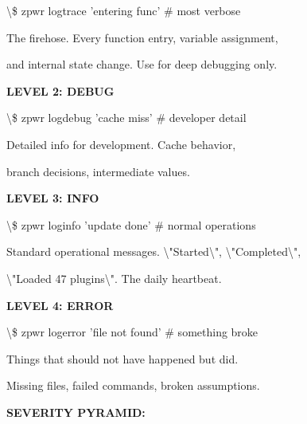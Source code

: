 \documentclass[11pt,a4paper,twoside]{book}
\begin{document}
\begin{codebox}
\textbackslash{}\$ zpwr logtrace 'entering func'  \# most verbose\\
\end{codebox}

The firehose. Every function entry, variable assignment,

and internal state change. Use for deep debugging only.


\vspace{12pt}
{\bfseries\color{neonyellow} LEVEL 2: DEBUG}\vspace{4pt}

\begin{codebox}
\textbackslash{}\$ zpwr logdebug 'cache miss'    \# developer detail\\
\end{codebox}

Detailed info for development. Cache behavior,

branch decisions, intermediate values.


\vspace{12pt}
{\bfseries\color{neonyellow} LEVEL 3: INFO}\vspace{4pt}

\begin{codebox}
\textbackslash{}\$ zpwr loginfo 'update done'    \# normal operations\\
\end{codebox}

Standard operational messages. \textbackslash{}"Started\textbackslash{}", \textbackslash{}"Completed\textbackslash{}",

\textbackslash{}"Loaded 47 plugins\textbackslash{}". The daily heartbeat.


\vspace{12pt}
{\bfseries\color{neonyellow} LEVEL 4: ERROR}\vspace{4pt}

\begin{codebox}
\textbackslash{}\$ zpwr logerror 'file not found' \# something broke\\
\end{codebox}

Things that should not have happened but did.

Missing files, failed commands, broken assumptions.


\vspace{12pt}
{\bfseries\color{neonyellow} SEVERITY PYRAMID:}\vspace{4pt}
\end{document}
